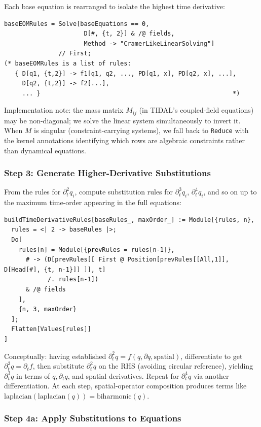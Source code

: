 Each base equation is rearranged to isolate the highest time derivative:
\begin{verbatim}
baseEOMRules = Solve[baseEquations == 0,
                      D[#, {t, 2}] & /@ fields,
                      Method -> "CramerLikeLinearSolving"]
               // First;
(* baseEOMRules is a list of rules:
   { D[q1, {t,2}] -> f1[q1, q2, ..., PD[q1, x], PD[q2, x], ...],
     D[q2, {t,2}] -> f2[...],
     ... }                                                     *)
\end{verbatim}

Implementation note: the mass matrix $M_{ij}$ (in TIDAL's coupled-field equations) may be non-diagonal; we solve the linear system simultaneously to invert it. When $M$ is singular (constraint-carrying systems), we fall back to \texttt{Reduce} with the kernel annotations identifying which rows are algebraic constraints rather than dynamical equations.

\subsubsection{Step 3: Generate Higher-Derivative Substitutions}

From the rules for $\partial_t^2 q_i$, compute substitution rules for $\partial_t^3 q_i$, $\partial_t^4 q_i$, and so on up to the maximum time-order appearing in the full equations:

\begin{verbatim}
buildTimeDerivativeRules[baseRules_, maxOrder_] := Module[{rules, n},
  rules = <| 2 -> baseRules |>;
  Do[
    rules[n] = Module[{prevRules = rules[n-1]},
      # -> (D[prevRules[[ First @ Position[prevRules[[All,1]], D[Head[#], {t, n-1}]] ]], t]
            /. rules[n-1])
      & /@ fields
    ],
    {n, 3, maxOrder}
  ];
  Flatten[Values[rules]]
]
\end{verbatim}

Conceptually: having established $\partial_t^2 q = f(q, \partial q, \text{spatial})$, differentiate to get $\partial_t^3 q = \partial_t f$, then substitute $\partial_t^2 q$ on the RHS (avoiding circular reference), yielding $\partial_t^3 q$ in terms of $q, \partial_t q$, and spatial derivatives. Repeat for $\partial_t^4 q$ via another differentiation. At each step, spatial-operator composition produces terms like $\mathrm{laplacian}(\mathrm{laplacian}(q)) = \mathrm{biharmonic}(q)$.

\subsubsection{Step 4a: Apply Substitutions to Equations}


